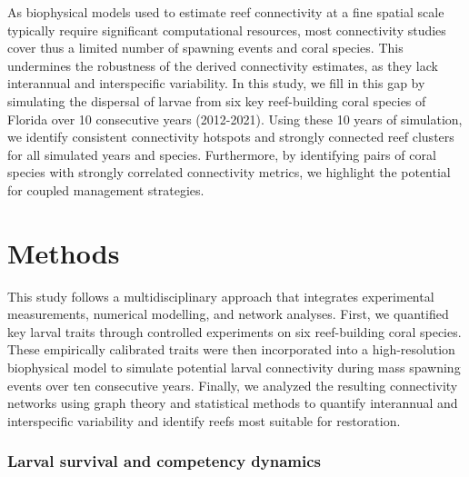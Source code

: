 \documentclass[preprint,12pt,authoryear]{elsarticle}
\begin{document}
As biophysical models used to estimate reef connectivity at a fine spatial scale typically require significant computational resources, most connectivity studies cover thus a limited number of spawning events and coral species. This undermines the robustness of the derived connectivity estimates, as they lack interannual and interspecific variability. In this study, we fill in this gap by simulating the dispersal of larvae from six key reef-building coral species of Florida over 10 consecutive years (2012-2021). Using these 10 years of simulation, we identify consistent connectivity hotspots and strongly connected reef clusters for all simulated years and species. Furthermore, by identifying pairs of coral species with strongly correlated connectivity metrics, we highlight the potential for coupled management strategies.


\section*{Methods}

This study follows a multidisciplinary approach that integrates experimental measurements, numerical modelling, and network analyses. First, we quantified key larval traits through controlled experiments on six reef-building coral species. These empirically calibrated traits were then incorporated into a high-resolution biophysical model to simulate potential larval connectivity during mass spawning events over ten consecutive years. Finally, we analyzed the resulting connectivity networks using graph theory and statistical methods to quantify interannual and interspecific variability and identify reefs most suitable for restoration.

\subsubsection*{Larval survival and competency dynamics}
\end{document}
